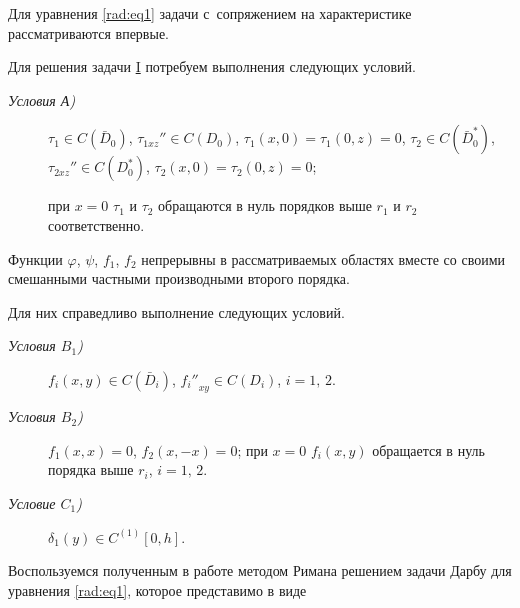 
Для уравнения \eqref{rad:eq1} задачи с~сопряжением на характеристике рассматриваются впервые.



Для решения задачи \hyperlink{rad:task:I}{I} потребуем выполнения следующих условий.



\begin{description}

\item[\sl Условия А\rm)] \hypertarget{rad:A}{}

$\tau_1\in C(\bar D_0)$, $\tau_{1xz}''\in C(D_0)$, $\tau_1(x,0)=\tau_1(0,z)=0$, $\tau_2\in C(\bar D_0^*)$, $\tau_{2xz}''\in C(D_0^*)$, $\tau_2(x,0)=\tau_2(0,z)=0$; 

при $x=0$ $\tau_1$ и $\tau_2$ обращаются в нуль порядков выше $r_1$ и $r_2$ соответственно.



\end{description}



Функции $\varphi$, $\psi$, $f_{1}$, $f_{2}$ непрерывны в рассматриваемых областях вместе со своими смешанными частными производными второго порядка.

Для них справедливо выполнение следующих условий.



\begin{description}

\item[\sl Условия $B_1$\rm)] \hypertarget{rad:B1}{} $f_i(x,y)\in C(\bar D_i)$, ${f_i''}_{xy}\in C(D_i)$, $i=1,\,2$.



\item[\sl Условия $B_2$\rm)]  \hypertarget{rad:B2}{} $f_1(x,x)=0$, $f_2(x,-x)=0$; при $x=0$ $f_i(x,y)$ обращается в нуль порядка выше $r_i$, $i=1,\,2$.



\item[\sl Условие $C_1$\rm)] \hypertarget{rad:C1}{} $\delta_1(y)\in C^{(1)}[0,h]$. 



\end{description}



Воспользуемся полученным в работе \cite{radionova:1} методом Римана решением задачи Дарбу для уравнения \eqref{rad:eq1}, которое представимо в виде

